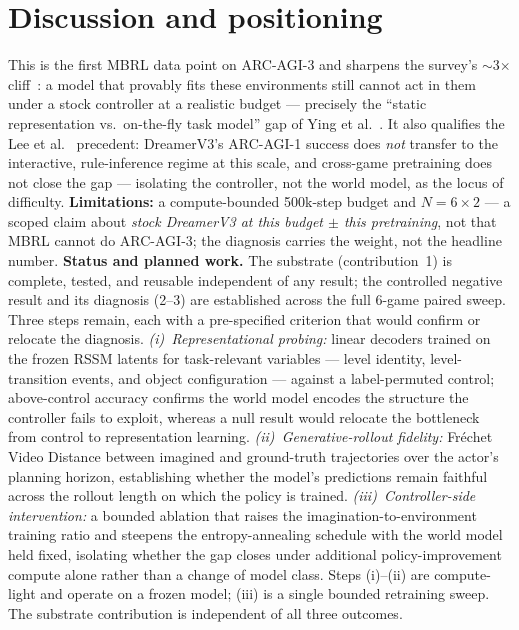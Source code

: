 \documentclass[10pt]{article}
\begin{document}
\section{Discussion and positioning}
This is the first MBRL data point on ARC-AGI-3 and sharpens the survey's
$\sim$3$\times$ cliff~\cite{survey2026}: a model that provably fits these
environments still cannot act in them under a stock controller at a realistic
budget --- precisely the ``static representation vs.\ on-the-fly task model''
gap of Ying et al.~\cite{ying2025}. It also qualifies the Lee et
al.~\cite{lee2024} precedent: DreamerV3's ARC-AGI-1 success does \emph{not}
transfer to the interactive, rule-inference regime at this scale, and
cross-game pretraining does not close the gap --- isolating the controller, not
the world model, as the locus of difficulty. \textbf{Limitations:} a compute-bounded 500k-step budget and $N=6\times2$ ---
a scoped claim about \emph{stock DreamerV3 at this budget $\pm$ this
pretraining}, not that MBRL cannot do ARC-AGI-3; the diagnosis carries the
weight, not the headline number.
\textbf{Status and planned work.} The substrate (contribution~1) is complete,
tested, and reusable independent of any result; the controlled negative result
and its diagnosis (2--3) are established across the full 6-game paired sweep.
Three steps remain, each with a pre-specified criterion that would confirm or
relocate the diagnosis. \emph{(i)~Representational probing:} linear decoders
trained on the frozen RSSM latents for task-relevant variables --- level
identity, level-transition events, and object configuration --- against a
label-permuted control; above-control accuracy confirms the world model
encodes the structure the controller fails to exploit, whereas a null result
would relocate the bottleneck from control to representation learning.
\emph{(ii)~Generative-rollout fidelity:} Fr\'echet Video Distance between
imagined and ground-truth trajectories over the actor's planning horizon,
establishing whether the model's predictions remain faithful across the
rollout length on which the policy is trained. \emph{(iii)~Controller-side
intervention:} a bounded ablation that raises the imagination-to-environment
training ratio and steepens the entropy-annealing schedule with the world
model held fixed, isolating whether the gap closes under additional
policy-improvement compute alone rather than a change of model class. Steps
(i)--(ii) are compute-light and operate on a frozen model; (iii) is a single
bounded retraining sweep. The substrate contribution is independent of all
three outcomes.
\end{document}
